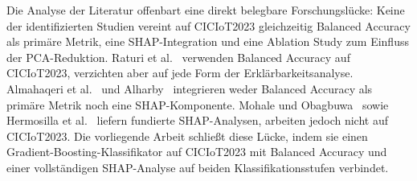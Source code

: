 \documentclass[letterpaper,twocolumn,10pt]{article}
\begin{document}
Die Analyse der Literatur offenbart eine direkt belegbare
Forschungslücke: Keine der identifizierten Studien vereint auf
CICIoT2023 gleichzeitig Balanced Accuracy als primäre Metrik, eine
SHAP-Integration und eine Ablation Study zum Einfluss der
PCA-Reduktion. Raturi et al.~\cite{raturi2026exploratory} verwenden
Balanced Accuracy auf CICIoT2023, verzichten aber auf jede Form der
Erklärbarkeitsanalyse. Almahaqeri et al.~\cite{almahaqeri2026gradient}
und Alharby~\cite{alharby2025ciciot} integrieren weder Balanced
Accuracy als primäre Metrik noch eine SHAP-Komponente. Mohale und
Obagbuwa~\cite{mohale2025xai} sowie Hermosilla et
al.~\cite{hermosilla2025xai_forensic} liefern fundierte SHAP-Analysen,
arbeiten jedoch nicht auf CICIoT2023. Die vorliegende Arbeit schließt
diese Lücke, indem sie einen Gradient-Boosting-Klassifikator auf
CICIoT2023 mit Balanced Accuracy und einer vollständigen SHAP-Analyse
auf beiden Klassifikationsstufen verbindet.
\end{document}
